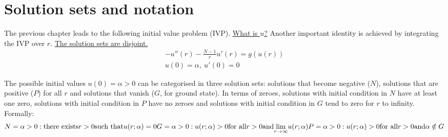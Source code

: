 \section{Solution sets and notation}\label{not}
The previous chapter leads to the following initial value problem (IVP). \underline{What is $u$?} Another important identity is achieved by integrating the IVP over $r$. \underline{The solution sets are disjoint.}
\begin{gather*}-u''(r)-\frac{N-1}{r}u'(r)=g(u(r))\tag{IVP}\label{ivp}\\ u(0)=\alpha,~u'(0)=0\end{gather*}
\begin{equation}\label{ivpint}
\end{equation}

The possible initial values $u(0)=\alpha>0$ can be categorised in three solution sets: solutions that become negative ($N$), solutions that are positive ($P$) for all $r$ and solutions that vanish ($G$, for ground state). In terms of zeroes, solutions with initial condition in $N$ have at least one zero, solutions with initial condition in $P$ have no zeroes and solutions with initial condition in $G$ tend to zero for $r$ to infinity. Formally:
$$
  N = {\alpha>0:\text{there exists}r>0\text{such that}u(r;\alpha)=0} \\
  G = {\alpha>0:u(r;\alpha)>0\text{for all}r>0\text{and}\underset{r\to\infty}{\lim}u(r;\alpha)}\\
  P = {\alpha>0:u(r;\alpha)>0\text{for all}r>0\text{and}\alpha\notin G}
$$
